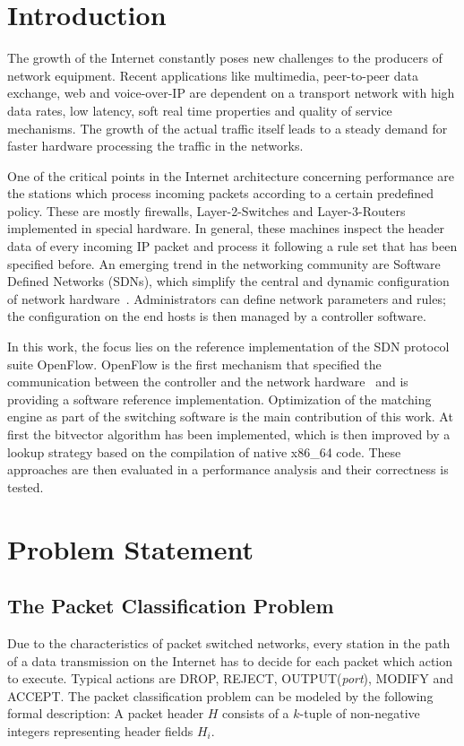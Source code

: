 \documentclass[conference]{IEEEtran}
\begin{document}
\section{Introduction}
\label{sec:intro}
The growth of the Internet constantly poses new challenges to the producers of network equipment.
Recent applications like multimedia, peer-to-peer data exchange, web and voice-over-IP are dependent on a transport network with
high data rates, low latency, soft real time properties and quality of service mechanisms.
The growth of the actual traffic itself leads to a steady demand for faster hardware processing the traffic in the networks.

One of the critical points in the Internet architecture concerning performance 
are the stations which process incoming packets according to a certain predefined policy.
These are mostly firewalls, Layer-2-Switches and Layer-3-Routers implemented in special hardware.
In general, these machines inspect the header data of every incoming IP packet and process it 
following a rule set that has been specified before.
An emerging trend in the networking community are Software Defined Networks (SDNs),
which simplify the central and dynamic configuration of network hardware~\cite{onf_whitepaper}.
Administrators can define network parameters and rules; the configuration 
on the end hosts is then managed by a controller software.

In this work, the focus lies on the reference implementation of the SDN protocol suite OpenFlow.
OpenFlow is the first mechanism that specified the communication between 
the controller and the network hardware~\cite{onf_whitepaper}
and is providing a software reference implementation.
Optimization of the matching engine as part of the switching software is the main contribution of this work.
At first the bitvector algorithm has been implemented, which is then improved by a lookup strategy
based on the compilation of native x86\_64 code.
These approaches are then evaluated in a performance analysis and their correctness is tested.

\section{Problem Statement}
\subsection{The Packet Classification Problem}
Due to the characteristics of packet switched networks, every station in the path of a data transmission on the Internet 
has to decide for each packet which action to execute.
Typical actions are DROP, REJECT, OUTPUT(\textit{port}), MODIFY and ACCEPT.
The packet classification problem can be modeled by the following formal description:
A packet header $H$ consists of a $k$-tuple of non-negative integers representing header fields $H_i$.
\end{document}
